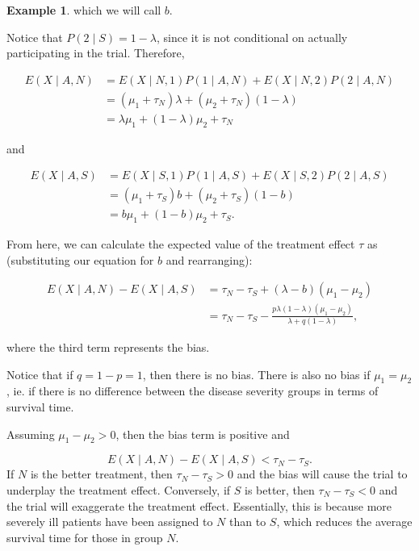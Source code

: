 \documentclass[
  openany]{book}
\theoremstyle{definition}
\theoremstyle{definition}
\newtheorem{example}{Example}[chapter]
\theoremstyle{definition}
\theoremstyle{definition}
\theoremstyle{remark}
\begin{document}
\begin{example}
which we will call \(b\).

Notice that \(P\left(2\mid{S}\right)= 1-\lambda\), since it is not conditional on actually participating in the trial. Therefore,

\begin{align*}
E\left(X\mid{A,N}\right) & = E \left(X\mid{N,1}\right)P\left(1\mid{A,N}\right) + E \left(X\mid{N,2}\right)P\left(2\mid{A,N}\right) \\
& = \left(\mu_1 + \tau_N\right)\lambda + \left(\mu_2 + \tau_N\right)\left(1-\lambda\right) \\
& = \lambda\mu_1 + \left(1-\lambda\right)\mu_2 + \tau_N
\end{align*}

and

\begin{align*}
E\left(X\mid{A,S}\right) & = E \left(X\mid{S,1}\right)P\left(1\mid{A,S}\right) + E \left(X\mid{S,2}\right)P\left(2\mid{A,S}\right) \\
& = \left(\mu_1 + \tau_S\right)b + \left(\mu_2 + \tau_S\right)\left(1-b\right) \\
& = b\mu_1 + \left(1-b\right)\mu_2 + \tau_S.
\end{align*}

From here, we can calculate the expected value of the treatment effect \(\tau\) as (substituting our equation for \(b\) and rearranging):

\begin{align*}
E\left(X\mid{A,N}\right) - E\left(X\mid{A,S}\right) & = \tau_N - \tau_S + \left(\lambda - b\right)\left(\mu_1 - \mu_2\right) \\
& = \tau_N - \tau_S - \frac{p\lambda\left(1-\lambda\right)\left(\mu_1  - \mu_2\right)}{\lambda + q\left(1-\lambda\right)},
\end{align*}

where the third term represents the bias.

Notice that if \(q=1-p = 1\), then there is no bias. There is also no bias if \(\mu_1 = \mu_2\), ie. if there is no difference between the disease severity groups in terms of survival time.

Assuming \(\mu_1 - \mu_2 >0\), then the bias term is positive and

\[E\left(X\mid{A,N}\right)- E\left(X\mid{A,S}\right) < \tau_N - \tau_S.\]
If \(N\) is the better treatment, then \(\tau_N - \tau_S>0\) and the bias will cause the trial to underplay the treatment effect. Conversely, if \(S\) is better, then \(\tau_N-\tau_S<0\) and the trial will exaggerate the treatment effect. Essentially, this is because more severely ill patients have been assigned to \(N\) than to \(S\), which reduces the average survival time for those in group \(N\).
\end{example}
\end{document}
